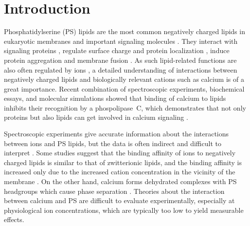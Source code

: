 \documentclass[journal=jctcce,manuscript=article]{achemso}
\begin{document}
 
 
 
\section{Introduction} 

Phosphatidylserine (PS) lipids are the most common negatively charged lipids in eukaryotic membranes
and important signaling molecules \cite{lemmon08,leventis10,li14}.
They interact with signaling proteins \cite{leventis10},
regulate surface charge and protein localization \cite{yeung08}, 
induce protein aggregation \cite{zhao04,gorbenko06} and membrane fusion \cite{wilschut1981calcium, papahadjopoulos90, verma2018cell}.
As such lipid-related functions are also often regulated by ions \cite{leventis10},
a detailed understanding of interactions between negatively charged lipids and biologically relevant cations such as calcium is of a great importance.
Recent combination of spectroscopic experiments, biochemical essays, and molecular simulations showed that binding of
calcium to  lipids inhibits their recognition by a phospolipase~C, 
which demonstrates that not only proteins but also lipids can get involved in calcium signaling \cite{Bilkova2017Calcium}.

Spectroscopic experiments give accurate information about the
interactions between ions and PS lipids, but the data is often indirect and difficult to
interpret \cite{hauser77,kurland79,eisenberg79,hauser83,dluhy83,hauser85,feigenson86,mattai89,roux90,roux91}.
Some studies suggest that the
binding affinity of ions to negatively charged lipids is similar to that of zwitterionic lipids,
and the binding affinity is increased only due to the increased cation
concentration in the vicinity of the membrane \cite{seelig90,sinn06}.
On the other hand, calcium forms dehydrated complexes with PS headgroups
which cause phase separation \cite{hauser77,kurland79,hauser85,feigenson86,mattai89,roux90,roux91,boettcher11}.
Theories about the interaction between calcium and PS 
are difficult to evaluate experimentally,
especially at physiological ion concentrations,
which are typically too low to yield measurable effects.
\end{document}
